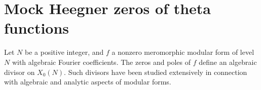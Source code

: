 \documentclass[11pt, reqno]{amsart}
\theoremstyle{plain}
\newtheorem{lemma}[theorem]{Lemma}
\theoremstyle{definition}
\numberwithin{equation}{section}
\begin{document}

    





\section{Mock Heegner zeros of theta functions}\label{mock}
Let $N  $ be a positive integer, and  $f$  a nonzero meromorphic modular form of level $ N $ with algebraic Fourier coefficients. The zeros and poles of $ f $ define an algebraic divisor on $ X_0(N)$. Such divisors have been studied extensively in connection with algebraic and analytic aspects of modular forms. 
\end{document}

